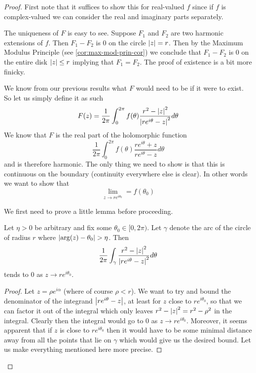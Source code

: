 \begin{proof}
First note that it suffices to show this for real-valued $f$ since if $f$ is complex-valued we can consider the real and imaginary parts separately.

The uniqueness of $F$ is easy to see. Suppose $F_1$ and $F_2$ are two harmonic extensions of $f$. Then $F_1 - F_2$ is 0 on the circle $\left|z\right| = r$. Then by the Maximum Modulus Principle (see \autoref{cor:max-mod-prin-cor}) we conclude that $F_1 - F_2$ is 0 on the entire disk $\left|z\right| \leq r$ implying that $F_1 = F_2$. The proof of existence is a bit more finicky.

We know from our previous results what $F$ would need to be if it were to exist. So let us simply define it as such
$$ F(z) = \frac{1}{2\pi} \int_0^{2\pi} f(\theta) \frac{r^2 - \left|z\right|^2}{\left|re^{i\theta} - z\right|^2} d\theta$$
We know that $F$ is the real part of the holomorphic function
$$ \frac{1}{2\pi} \int_0^{2\pi} f(\theta) \frac{re^{i\theta} + z}{re^{i\theta} - z} d\theta $$
and is therefore harmonic. The only thing we need to show is that this is continuous on the boundary (continuity everywhere else is clear). In other words we want to show that
$$\lim_{z \to re^{i\theta_0}} = f(\theta_0)$$

We first need to prove a little lemma before proceeding.
\begin{lemma}
Let $\eta > 0$ be arbitrary and fix some $\theta_0 \in [0, 2\pi)$. Let $\gamma$ denote the arc of the circle of radius $r$ where $\left|\arg(z) - \theta_0\right| > \eta$. Then 
$$ \frac{1}{2\pi} \int_{\gamma} \frac{r^2 - \left|z\right|^2}{\left|re^{i\theta} - z\right|^2} d\theta $$
tends to 0 as $z \to re^{i\theta_0}$.
\end{lemma}
\begin{proof}
    Let $z = \rho e^{i \alpha}$ (where of course $\rho < r$). We want to try and bound the denominator of the integrand $\left|re^{i \theta} - z\right|$, at least for $z$ close to $re^{i \theta_0}$, so that we can factor it out of the integral which only leaves $r^2 - \left|z\right|^2 = r^2 - \rho^2$ in the integral. Clearly then the integral would go to 0 as $z \to re^{i \theta_0}$. Moreover, it seems apparent that if $z$ is close to $re^{i\theta_0}$ then it would have to be some minimal distance away from all the points that lie on $\gamma$ which would give us the desired bound. Let us make everything mentioned here more precise.


\end{proof}
\end{proof}
